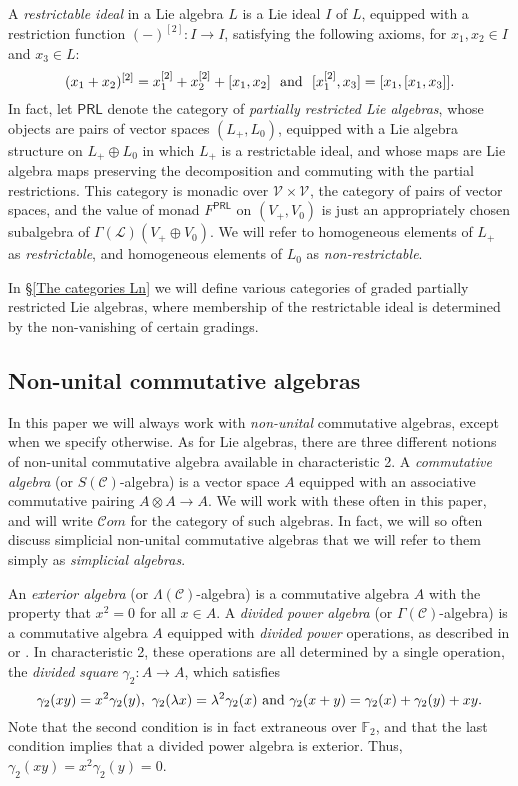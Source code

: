 \documentclass[11pt]{amsart} \renewcommand{\baselinestretch}{1.2}
\theoremstyle{plain}
\theoremstyle{definition}
\newcommand{\DASH}{\mathrm{-}}
\renewcommand{\to}{\longrightarrow}
\newcommand{\scrL}{\mathscr{L}}
\newcommand{\scrC}{\mathscr{C}}
\newcommand{\calV}{\mathcal{V}}
\newcommand{\citeBOX}[2][]{\cite[\mbox{#1}]{#2}}
\newcommand{\LieOperad}{{\scrL}}
\newcommand{\CommOperad}{{\scrC}}
\newcommand{\restn}[1]{#1^{[2]}}
\newcommand{\vect}[2]{\calV^{#1}_{#2}}
\newcommand{\F}{\mathbb{F}}
\newcommand{\algs}{{\scrC\!\textit{om}}}
\newcommand{\Ftwo}{\F_2}
\begin{document}
\begin{Conventions and notation}
A \emph{restrictable ideal} in a Lie algebra $L$ is a Lie ideal $I$ of $L$, equipped with a restriction function $\restn{(\DASH)}:I\to I$, satisfying the following axioms, for $x_1,x_2\in I$ and $x_3\in L$:
\[\restn{(x_1+x_2)}=\restn{x_1}+\restn{x_2}+[x_1,x_2]\textup{ \ and \ }[\restn{x_1},x_3]=[x_1,[x_1,x_3]].\]
In fact, let $\mathsf{PRL}$ denote the category of \emph{partially restricted Lie algebras}, whose objects are pairs of vector spaces $(L_+,L_0)$, equipped with a Lie algebra structure on $L_+\oplus L_0$ in which $L_+$ is a restrictable ideal, and whose maps are Lie algebra maps preserving the decomposition and commuting with the partial restrictions. This category is monadic over $\vect{}{}\times\vect{}{}$, the category of pairs of vector spaces, and the value of monad $F^{\mathsf{PRL}}$  on $(V_+,V_0)$ is just an appropriately chosen subalgebra of $\Gamma(\LieOperad)(V_+\oplus V_0)$. We will refer to homogeneous elements of $L_+$ as \emph{restrictable}, and homogeneous elements of $L_0$ as \emph{non-restrictable}.

In \S\ref{The categories Ln} we will define various categories of graded partially restricted Lie algebras, where membership of the restrictable ideal is determined by the non-vanishing of certain gradings.


\subsection{Non-unital commutative algebras}
In this paper we will always work with \emph{non-unital} commutative algebras, except when we specify otherwise. As for Lie algebras, there are three different notions of non-unital commutative algebra available in characteristic 2. A \emph{commutative algebra} (or $S(\CommOperad)$-algebra) is a vector space $A$ equipped with an associative commutative pairing $A\otimes A\to A$.  We will work with these often in this paper, and will write $\algs$ for the category of such algebras. In fact, we will so often discuss simplicial non-unital commutative algebras that we will refer to them simply as \emph{simplicial algebras}.

An \emph{exterior algebra} (or $\Lambda(\CommOperad)$-algebra) is a commutative algebra $A$ with the property that $x^2=0$ for all $x\in A$. A \emph{divided power algebra} (or $\Gamma(\CommOperad)$-algebra) is a commutative algebra $A$ equipped with \emph{divided power} operations, as described in \citeBOX[1.2.2]{FresseSimplicialAlgs.pdf} or \citeBOX[\S2]{MR1089001}. In characteristic 2, these operations are all determined by a single operation, the \emph{divided square} $\gamma_2:A\to A$, which satisfies
\[\gamma_2(xy)=x^2\gamma_2(y),\ \gamma_2(\lambda x)=\lambda^2\gamma_2(x)\textup{ and }\gamma_2(x+y)=\gamma_2(x)+\gamma_2(y)+xy.\]
Note that the second condition is in fact extraneous over $\Ftwo $, and that the last condition implies that a divided power algebra is exterior. Thus, $\gamma_2(xy)=x^2\gamma_2(y)=0$.


\end{Conventions and notation}
\end{document}

